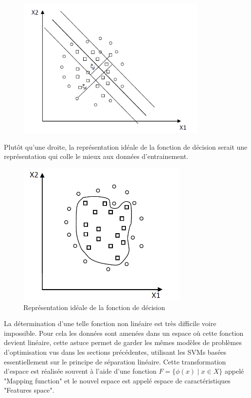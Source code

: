 \documentclass[12pt,a4paper]{report}
\begin{document}
\begin{figure}[!ht]
	\centering
	\includegraphics[width=9.5cm]{images/capt2}
\end{figure}
Plutôt qu’une droite, la représentation idéale de la fonction de décision serait une
représentation qui colle le mieux aux données d’entrainement.
\begin{figure}[!ht]
	\centering
	\includegraphics[width=8.5cm]{images/capt3}
	\caption{Représentation idéale de la fonction de décision}
\end{figure}



La détermination d'une telle fonction non linéaire est très difficile voire impossible. Pour cela les données sont amenées dans un espace où cette fonction devient linéaire, cette astuce permet de garder les mêmes modèles de problèmes d'optimisation vus dans les sections précédentes, utilisant les SVMs basées essentiellement sur le principe de séparation linéaire. Cette transformation d'espace est réalisée souvent à l'aide d'une fonction $F=\{\phi(x) \mid x \in X\}$ appelé "Mapping function" et le nouvel espace est appelé espace de caractéristiques "Features space".
\end{document}
